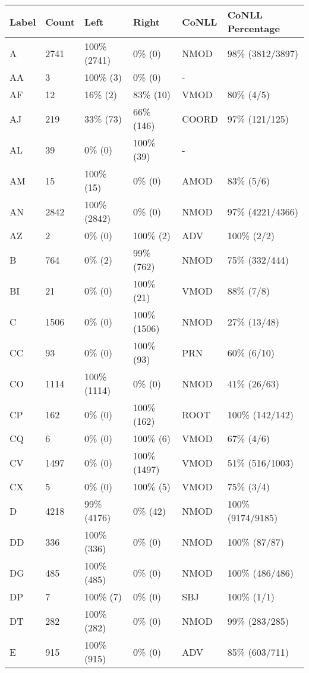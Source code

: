 \begin{figure*}
\begin{tabular}{|l|l|l|l||l|l|}
\hline
Label & Count & Left & Right & CoNLL & CoNLL Percentage\\ 
\hline
 A & 2741 & 100\% (2741) & 0\% (0) & NMOD & 98\% (3812/3897) \\ 
\hline
 AA & 3 & 100\% (3) & 0\% (0) & - &  \\ 
\hline
 AF & 12 & 16\% (2) & 83\% (10) & VMOD & 80\% (4/5) \\ 
\hline
 AJ & 219 & 33\% (73) & 66\% (146) & COORD & 97\% (121/125) \\ 
\hline
 AL & 39 & 0\% (0) & 100\% (39) & - &  \\ 
\hline
 AM & 15 & 100\% (15) & 0\% (0) & AMOD & 83\% (5/6) \\ 
\hline
 AN & 2842 & 100\% (2842) & 0\% (0) & NMOD & 97\% (4221/4366) \\ 
\hline
 AZ & 2 & 0\% (0) & 100\% (2) & ADV & 100\% (2/2) \\ 
\hline
 B & 764 & 0\% (2) & 99\% (762) & NMOD & 75\% (332/444) \\ 
\hline
 BI & 21 & 0\% (0) & 100\% (21) & VMOD & 88\% (7/8) \\ 
\hline
 C & 1506 & 0\% (0) & 100\% (1506) & NMOD & 27\% (13/48) \\ 
\hline
 CC & 93 & 0\% (0) & 100\% (93) & PRN & 60\% (6/10) \\ 
\hline
 CO & 1114 & 100\% (1114) & 0\% (0) & NMOD & 41\% (26/63) \\ 
\hline
 CP & 162 & 0\% (0) & 100\% (162) & ROOT & 100\% (142/142) \\ 
\hline
 CQ & 6 & 0\% (0) & 100\% (6) & VMOD & 67\% (4/6) \\ 
\hline
 CV & 1497 & 0\% (0) & 100\% (1497) & VMOD & 51\% (516/1003) \\ 
\hline
 CX & 5 & 0\% (0) & 100\% (5) & VMOD & 75\% (3/4) \\ 
\hline
 D & 4218 & 99\% (4176) & 0\% (42) & NMOD & 100\% (9174/9185) \\ 
\hline
 DD & 336 & 100\% (336) & 0\% (0) & NMOD & 100\% (87/87) \\ 
\hline
 DG & 485 & 100\% (485) & 0\% (0) & NMOD & 100\% (486/486) \\ 
\hline
 DP & 7 & 100\% (7) & 0\% (0) & SBJ & 100\% (1/1) \\ 
\hline
 DT & 282 & 100\% (282) & 0\% (0) & NMOD & 99\% (283/285) \\ 
\hline
 E & 915 & 100\% (915) & 0\% (0) & ADV & 85\% (603/711) \\ 

\end{tabular}
\end{figure*}
